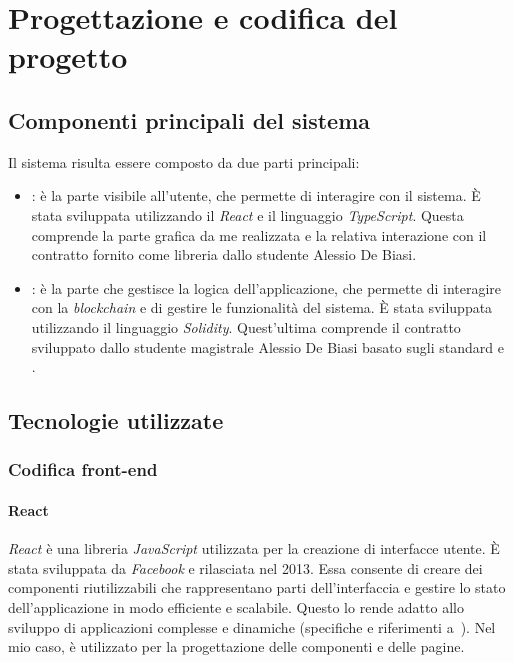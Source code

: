 \chapter{Progettazione e codifica del progetto}\label{cap:progettazione-codifica}


\section{Componenti principali del sistema}\label{sec:componenti-principali}
Il sistema risulta essere composto da due parti principali: 
\begin{itemize}
    \item {\textbf{}}: è la parte visibile all'utente, che permette di interagire con il sistema. È stata sviluppata utilizzando il  \textit{React} e il linguaggio \textit{TypeScript}. 
    Questa comprende la parte grafica da me realizzata e la relativa interazione con il contratto fornito come libreria dallo studente Alessio De Biasi.
    \item {\textbf{}}: è la parte che gestisce la logica dell'applicazione, che permette di interagire con la \textit{blockchain} e di gestire le funzionalità del sistema. È stata sviluppata utilizzando il linguaggio \textit{Solidity}.
    Quest'ultima comprende il contratto sviluppato dallo studente magistrale Alessio De Biasi basato sugli standard   e .
\end{itemize}

\section{Tecnologie utilizzate}\label{sec:tecnologie-strumenti}

\subsection{Codifica front-end}\label{subsec:codifica-front-end}

\subsubsection{React}\label{subsubsec:react}
\textit{React} è una libreria \textit{JavaScript} utilizzata per la creazione di interfacce utente. È stata sviluppata da \textit{Facebook} e rilasciata nel 2013. 
Essa consente di creare dei componenti riutilizzabili che rappresentano parti dell'interfaccia e gestire lo stato dell'applicazione in modo efficiente e scalabile.
Questo lo rende adatto allo sviluppo di applicazioni complesse e dinamiche (specifiche e riferimenti a~\cite{site:react}).
Nel mio caso, è utilizzato per la progettazione delle componenti e delle pagine.

